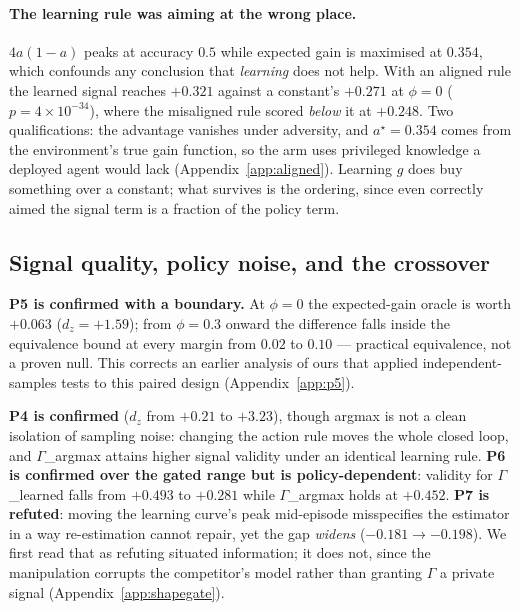 \documentclass{article}
\begin{document}
\paragraph{The learning rule was aiming at the wrong place.} $4a(1-a)$ peaks at accuracy $0.5$ while expected gain is maximised at $0.354$, which confounds any conclusion that \emph{learning} does not help. With an aligned rule the learned signal reaches $+0.321$ against a constant's $+0.271$ at $\phi{=}0$ ($p{=}4\times10^{-34}$), where the misaligned rule scored \emph{below} it at $+0.248$. Two qualifications: the advantage vanishes under adversity, and $a^\star{=}0.354$ comes from the environment's true gain function, so the arm uses privileged knowledge a deployed agent would lack (Appendix~\ref{app:aligned}). Learning $g$ does buy something over a constant; what survives is the ordering, since even correctly aimed the signal term is a fraction of the policy term.

\subsection{Signal quality, policy noise, and the crossover}
\label{sec:policy}\label{sec:objmodel}\label{sec:misspec}

\textbf{P5 is confirmed with a boundary.} At $\phi{=}0$ the expected-gain oracle is worth $+0.063$ ($d_z{=}{+}1.59$); from $\phi{=}0.3$ onward the difference falls inside the equivalence bound at every margin from $0.02$ to $0.10$ --- practical equivalence, not a proven null. This corrects an earlier analysis of ours that applied independent-samples tests to this paired design (Appendix~\ref{app:p5}).

\textbf{P4 is confirmed} ($d_z$ from $+0.21$ to $+3.23$), though argmax is not a clean isolation of sampling noise: changing the action rule moves the whole closed loop, and $\Gamma$\_argmax attains higher signal validity under an identical learning rule. \textbf{P6 is confirmed over the gated range but is policy-dependent}: validity for $\Gamma$\_learned falls from $+0.493$ to $+0.281$ while $\Gamma$\_argmax holds at $+0.452$. \textbf{P7 is refuted}: moving the learning curve's peak mid-episode misspecifies the estimator in a way re-estimation cannot repair, yet the gap \emph{widens} ($-0.181\to-0.198$). We first read that as refuting situated information; it does not, since the manipulation corrupts the competitor's model rather than granting $\Gamma$ a private signal (Appendix~\ref{app:shapegate}).
\end{document}
